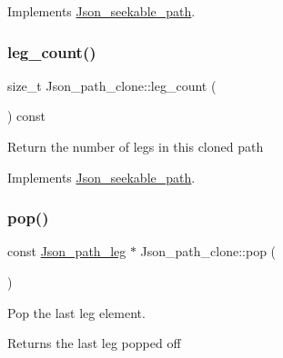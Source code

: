 Implements \mbox{\hyperlink{classJson__seekable__path_a590e675762b99402555d555fb99ffa4f}{Json\+\_\+seekable\+\_\+path}}.

\mbox{\label{classJson__path__clone_a7b3217b45baaa958cc2a48a1e03bbe31}} 
\subsubsection{\texorpdfstring{leg\+\_\+count()}{leg\_count()}}
{\footnotesize\ttfamily size\+\_\+t Json\+\_\+path\+\_\+clone\+::leg\+\_\+count (\begin{DoxyParamCaption}{ }\end{DoxyParamCaption}) const\hspace{0.3cm}{\ttfamily [virtual]}}

Return the number of legs in this cloned path 

Implements \mbox{\hyperlink{classJson__seekable__path_aa268c1af2eec01b70924509a23b8db59}{Json\+\_\+seekable\+\_\+path}}.

\mbox{\label{classJson__path__clone_afbf830602783d78bb7283fcaf35e7d9e}} 
\subsubsection{\texorpdfstring{pop()}{pop()}}
{\footnotesize\ttfamily const \mbox{\hyperlink{classJson__path__leg}{Json\+\_\+path\+\_\+leg}} $\ast$ Json\+\_\+path\+\_\+clone\+::pop (\begin{DoxyParamCaption}{ }\end{DoxyParamCaption})}

Pop the last leg element.

\begin{DoxyReturn}{Returns}
the last leg popped off 
\end{DoxyReturn}
\mbox{\label{classJson__path__clone_aa9a9fa559013cddfa0f1096b72a917e0}} 
